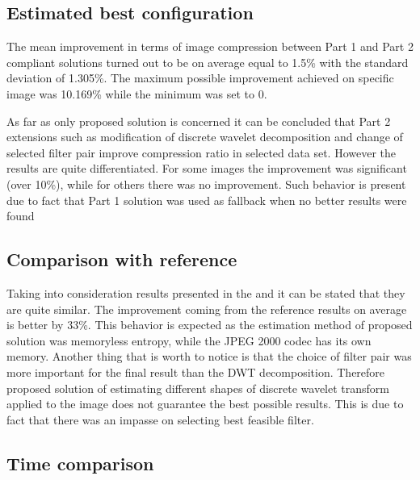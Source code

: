 \subsection{Estimated best configuration} \label{sec:my_results}

The mean improvement in terms of image compression between Part 1 and Part 2 compliant solutions
turned out to be on average equal to 1.5\% with the standard deviation of 1.305\%. The maximum
possible improvement achieved on specific image was 10.169\% while the minimum was set to 0.

As far as only proposed solution is concerned it can be concluded that Part 2 extensions such as modification
of discrete wavelet decomposition and change of selected filter pair improve compression ratio
in selected data set. However the results are quite differentiated. For some images the improvement
was significant (over 10\%), while for others there was no improvement. Such behavior is present
due to fact that Part 1 solution was used as fallback when no better results were found


\subsection{Comparison with reference} \label{sec:results_comparison}

Taking into consideration results presented in the  and 
it can be stated that they are quite similar. The improvement coming from the reference results on average
is  better by 33\%. This behavior is expected as the estimation method of proposed solution was memoryless
entropy, while the JPEG 2000 codec has its own memory. Another thing that is worth to notice is that the
choice of filter pair was more important for the final result than the DWT decomposition.
Therefore proposed solution of estimating different shapes of discrete wavelet transform applied
to the image does not guarantee the best possible results. This is due to fact that there was
an impasse on selecting best feasible filter.

\subsection{Time comparison} \label{sec:time_results}

